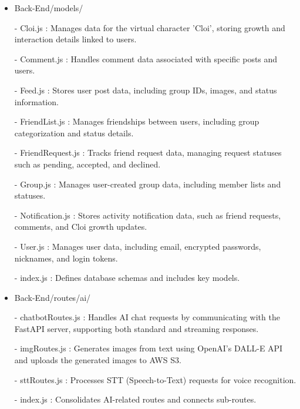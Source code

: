 \documentclass[conference]{IEEEtran}
\begin{document}
\begin{itemize}
                    \item Back-End/models/
                        \item[-] Cloi.js : Manages data for the virtual character 'Cloi', storing growth and interaction details linked to users.
                        \item[-] Comment.js : Handles comment data associated with specific posts and users.
                        \item[-] Feed.js : Stores user post data, including group IDs, images, and status information.
                        \item[-] FriendList.js : Manages friendships between users, including group categorization and status details.
                        \item[-] FriendRequest.js : Tracks friend request data, managing request statuses such as pending, accepted, and declined.
                        \item[-] Group.js : Manages user-created group data, including member lists and statuses.
                        \item[-] Notification.js : Stores activity notification data, such as friend requests, comments, and Cloi growth updates.
                        \item[-] User.js : Manages user data, including email, encrypted passwords, nicknames, and login tokens.
                        \item[-] index.js : Defines database schemas and includes key models.
                    \vspace{3mm}
                    
                    \item Back-End/routes/ai/
                        \item[-] chatbotRoutes.js : Handles AI chat requests by communicating with the FastAPI server, supporting both standard and streaming responses.
                        \item[-] imgRoutes.js : Generates images from text using OpenAI's DALL-E API and uploads the generated images to AWS S3.
                        \item[-] sttRoutes.js : Processes STT (Speech-to-Text) requests for voice recognition.
                        \item[-] index.js : Consolidates AI-related routes and connects sub-routes.
                    \vspace{3mm}
                    

\end{itemize}
\end{document}
